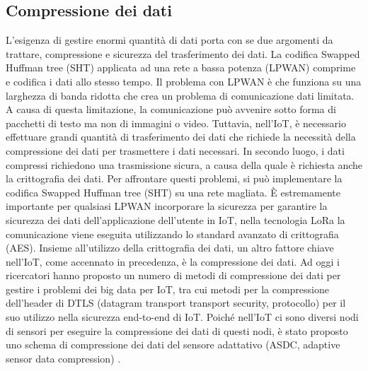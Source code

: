 \documentclass[a4paper]{report} %
\begin{document}
\subsection{Compressione dei dati}
L'esigenza di gestire enormi quantità di dati porta con se due argomenti da trattare, compressione e sicurezza del trasferimento dei dati. La codifica Swapped Huffman tree (SHT) applicata ad una rete a bassa potenza (LPWAN) comprime e codifica i dati allo stesso tempo.
Il problema con LPWAN è che funziona su una larghezza di banda ridotta che crea un problema di comunicazione dati limitata. A causa di questa limitazione, la comunicazione può avvenire sotto forma di pacchetti di testo ma non di immagini o video. Tuttavia, nell'IoT, è necessario effettuare grandi quantità di trasferimento dei dati che richiede la necessità della compressione dei dati per trasmettere i dati necessari. In secondo luogo, i dati compressi richiedono una trasmissione sicura, a causa della quale è richiesta anche la crittografia dei dati. Per affrontare questi problemi, si può implementare la codifica Swapped Huffman tree (SHT) su una rete magliata.
È estremamente importante per qualsiasi LPWAN incorporare la sicurezza per garantire la sicurezza dei dati dell'applicazione dell'utente in IoT, nella tecnologia LoRa la comunicazione viene eseguita utilizzando lo standard avanzato di crittografia (AES).  Insieme all'utilizzo della crittografia dei dati, un altro fattore chiave nell'IoT, come accennato in precedenza, è la compressione dei dati.
Ad oggi i ricercatori hanno proposto un numero di metodi di compressione dei dati per gestire i problemi dei big data per IoT, tra cui metodi per la compressione dell'header di DTLS (datagram transport transport security, protocollo) per il suo utilizzo nella sicurezza end-to-end di IoT. Poiché nell'IoT ci sono diversi nodi di sensori per eseguire la compressione dei dati di questi nodi, è stato proposto uno schema di compressione dei dati del sensore adattativo (ASDC, adaptive sensor data compression) \cite{art:rif.45}. 
\end{document}
